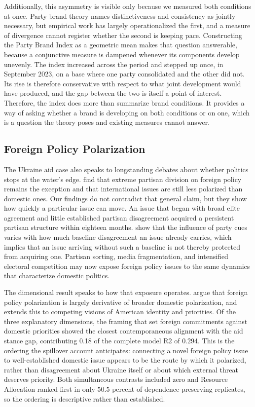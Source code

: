 Additionally, this asymmetry is visible only because we measured both conditions at once. Party brand theory names distinctiveness and consistency as jointly necessary, but empirical work has largely operationalized the first, and a measure of divergence cannot register whether the second is keeping pace. Constructing the Party Brand Index as a geometric mean makes that question answerable, because a conjunctive measure is dampened whenever its components develop unevenly. The index increased across the period and stepped up once, in September 2023, on a base where one party consolidated and the other did not. Its rise is therefore conservative with respect to what joint development would have produced, and the gap between the two is itself a point of interest. Therefore, the index does more than summarize brand conditions. It provides a way of asking whether a brand is developing on both conditions or on one, which is a question the theory poses and existing measures cannot answer.

\subsection{Foreign Policy Polarization}

The Ukraine aid case also speaks to longstanding debates about whether politics stops at the water's edge. \citet{bryanPrevalenceBipartisanshipUS2022} find that extreme partisan division on foreign policy remains the exception and that international issues are still less polarized than domestic ones. Our findings do not contradict that general claim, but they show how quickly a particular issue can move. An issue that began with broad elite agreement and little established partisan disagreement acquired a persistent partisan structure within eighteen months. \citet{guisingerMappingBoundariesElite2017} show that the influence of party cues varies with how much baseline disagreement an issue already carries, which implies that an issue arriving without such a baseline is not thereby protected from acquiring one. Partisan sorting, media fragmentation, and intensified electoral competition may now expose foreign policy issues to the same dynamics that characterize domestic politics.

The dimensional result speaks to how that exposure operates. \citet{jeongDivisionWatersEdge2019} argue that foreign policy polarization is largely derivative of broader domestic polarization, and \citet{borgBattleSoulThis2024} extends this to competing visions of American identity and priorities. Of the three explanatory dimensions, the framing that set foreign commitments against domestic priorities showed the closest contemporaneous alignment with the aid stance gap, contributing 0.18 of the complete model R2 of 0.294. This is the ordering the spillover account anticipates: connecting a novel foreign policy issue to well-established domestic issue appears to be the route by which it polarized, rather than disagreement about Ukraine itself or about which external threat deserves priority. Both simultaneous contrasts included zero and Resource Allocation ranked first in only 50.5 percent of dependence-preserving replicates, so the ordering is descriptive rather than established.

